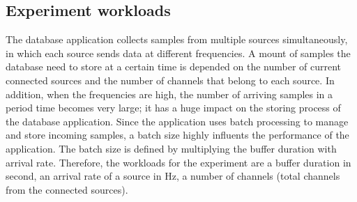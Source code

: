 \subsection{Experiment workloads}
The database application collects samples from multiple sources simultaneously, in which each source sends data at different frequencies. A mount of samples the database need to store at a certain time is depended on the number of current connected sources and the number of channels that belong to each source. In addition, when the frequencies are high, the number of arriving samples in a period time becomes very large; it has a huge impact on the storing process of the database application. Since the application uses batch processing to manage and store incoming samples, a batch size highly influents the performance of the application. The batch size is defined by multiplying the buffer duration with arrival rate. Therefore, the workloads for the experiment are a buffer duration in second, an arrival rate of a source in Hz, a number of channels (total channels from the connected sources).
